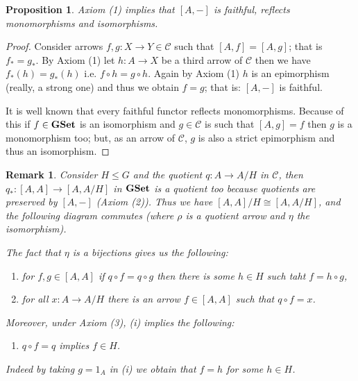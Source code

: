 \documentclass[italian, 12pt, reqno]{article}
\theoremstyle{myteo}
\newtheorem{proposition}[theorem]{Proposition}
\newtheorem{remark}[theorem]{Remark}
\numberwithin{equation}{section}
\newcommand{\cat}[1]{\mathscr{#1}}
\newcommand{\gset}{\text{\textbf{GSet}}}
\newcommand{\homs}[2]{[#1, #2]}
\newcommand{\fun}[3]{#1\colon#2\to #3}
\begin{document}
\begin{proposition}
  \label{prop:hom_is_faithful}
  Axiom (1) implies that \(\homs{A}{-}\) is faithful, reflects monomorphisms and isomorphisms.
\end{proposition}

\begin{proof}
  Consider arrows \(\fun{f,g}{X}{Y}\in\cat{C}\) such that \(\homs{A}{f} = \homs{A}{g}\); that is \(f_* = g_*\).
  By Axiom (1) let \(\fun{h}{A}{X}\) be a third arrow of \(\cat{C}\) then we have \(f_*(h) = g_*(h)\) i.e. \(f\circ h = g\circ h\).
  Again by Axiom (1) \(h\) is an epimorphism (really, a strong one) and thus we obtain \(f = g\); that is: \(\homs{A}{-}\) is faithful.
  
  It is well known that every faithful functor reflects monomorphisms.
  Because of this if \(f\in\gset\) is an isomorphism and \(g\in\cat{C}\) is such that \(\homs{A}{g} = f\) then \(g\) is a monomorphism too; but, as an arrow of \(\cat{C}\), \(g\) is also a strict epimorphism and thus an isomorphism.
\end{proof}

\begin{remark}
  \label{rem:axiom1}
  Consider \(H\leq G\) and the quotient \(\fun{q}{A}{A/H}\) in \(\cat{C}\), then \(\fun{q_*}{\homs{A}{A}}{\homs{A}{A/H}}\) in \(\gset\) is a quotient too because quotients are preserved by \(\homs{A}{-}\) (Axiom (2)).
  Thus we have \(\homs{A}{A}/H \cong \homs{A}{A/H}\), and the following diagram commutes (where \(\rho\) is a quotient arrow and \(\eta\) the isomorphism).

  \begin{center}
  \end{center}

  The fact that \(\eta\) is a bijections gives us the following:
  \begin{enumerate}
  \item[(i)] for \(f, g\in \homs{A}{A}\) if \(q\circ f = q\circ g\) then there is some \(h\in H\) such taht \(f = h\circ g\),
  \item[(ii)] for all \(\fun{x}{A}{A/H}\) there is an arrow \(f\in\homs{A}{A}\) such that \(q\circ f = x\).
  \end{enumerate}
  Moreover, under Axiom (3), (i) implies the following:
  \begin{enumerate}
  \item[(iii)] \(q\circ f = q\) implies \(f\in H\).
  \end{enumerate}
  Indeed by taking \(g = 1_A\) in (i) we obtain that \(f = h\) for some \(h\in H\).
\end{remark}
\end{document}
